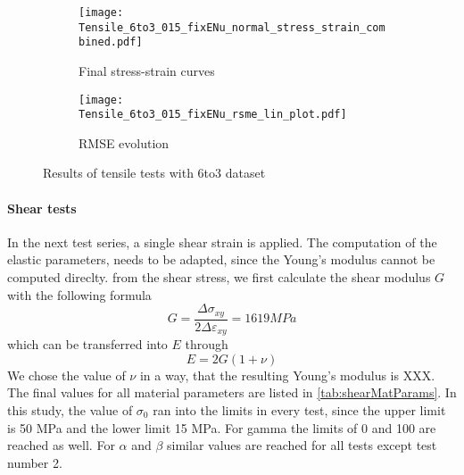 \begin{figure}[H]
\centering
\begin{subfigure}[t]{0.495\textwidth}
    \centering
    \texttt{[image: Tensile\_6to3\_015\_fixENu\_normal\_stress\_strain\_combined.pdf]}
    \caption{Final stress-strain curves}
    \label{fig:tensileStressStrain6to3}
\end{subfigure}
\hfill
\begin{subfigure}[t]{0.495\textwidth}
    \centering
    \texttt{[image: Tensile\_6to3\_015\_fixENu\_rsme\_lin\_plot.pdf]}
    \caption{RMSE evolution}
    \label{subfigure:tensileRMSE}
\end{subfigure}
\caption{Results of tensile tests with 6to3 dataset}
\label{fig:tensileResults6to3}
\end{figure}



\paragraph{Shear tests}
In the next test series, a single shear strain is applied. The computation of the elastic parameters, needs to be adapted, since the Young's modulus cannot be computed direclty. from the shear stress, we first calculate the shear modulus $G$ with the following formula
\begin{equation}
    G = \frac{\Delta\sigma_{xy}}{2\Delta\varepsilon_{xy}} = 1619 MPa
\end{equation}
which can be transferred into $E$ through
\begin{equation}
    E = 2G(1+\nu) 
\end{equation}
We chose the value of $\nu$ in a way, that the resulting Young's modulus is XXX. The final values for all material parameters are listed in \autoref{tab:shearMatParams}. In this study, the value of $\sigma_0$ ran into the limits in every test, since the upper limit is 50 MPa and the lower limit 15 MPa. For gamma the limits of 0  and 100 are reached as well. For $\alpha$ and $\beta$ similar values are reached for all tests except test number 2. 

